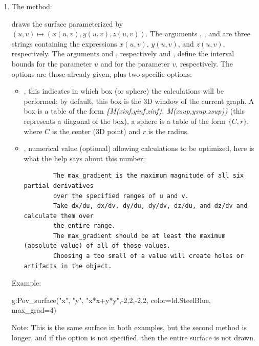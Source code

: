 \begin{itemize}
\begin{enumerate}
        \item The method: 
        
        draws the surface parameterized by $(u,v)\mapsto (x(u,v), y(u,v), z(u,v))$. The arguments , , and  are three strings containing the expressions $x(u,v)$, $y(u,v)$, and $z(u,v)$, respectively. The arguments  and , respectively  and , define the interval bounds for the parameter $u$ and for the parameter $v$, respectively. The options are those already given, plus two specific options:
        \begin{itemize}
        \item {}, this indicates in which box (or sphere) the calculations will be performed; by default, this box is the 3D window of the current graph. A box is a table of the form \emph{\{M(xinf,yinf,zinf), M(xsup,ysup,zsup)\}} (this represents a diagonal of the box), a sphere is a table of the form $\{C,r\}$, where $C$ is the center (3D point) and $r$ is the radius.
        
        \item {}, numerical value (optional) allowing calculations to be optimized, here is what the \povray help says about this number: 
        \begin{small} 
        \begin{verbatim} 
        The max_gradient is the maximum magnitude of all six partial derivatives 
        over the specified ranges of u and v. 
        Take dx/du, dx/dv, dy/du, dy/dv, dz/du, and dz/dv and calculate them over 
        the entire range. 
        The max_gradient should be at least the maximum (absolute value) of all of those values. 
        Choosing a too small of a value will create holes or artifacts in the object. 
        \end{verbatim}
        \end{small}
        \end{itemize}
        Example:
        \begin{Luacode}
        g:Pov_surface("x", "y", "x*x+y*y",-2,2,-2,2, {color=ld.SteelBlue, max_grad=4})
        \end{Luacode}
        Note: This is the same surface in both examples, but the second method is longer, and if the  option is not specified, then the entire surface is not drawn.
    \end{enumerate}


\end{itemize}
